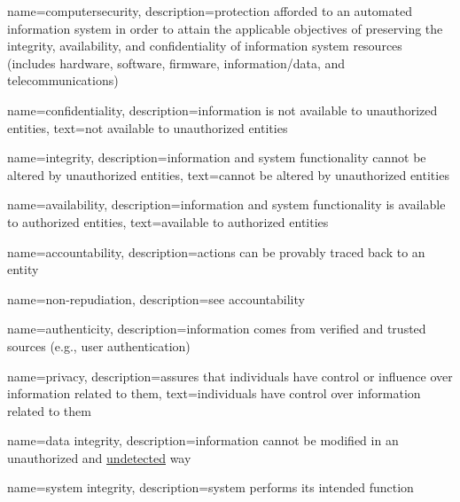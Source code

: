 {\glsentrytext{\glslabel}}%
{\glsentryshortname}%
{\Glsentryshortname}%
{\glsshortname}%
{\Glsshortname}%
{\GLSshortname}%


{
    name=computersecurity,
    description={protection afforded to an automated information system in order to attain the applicable objectives of preserving the \gls{integrity}, \gls{availability}, and \gls{confidentiality} of information system resources (includes hardware, software, firmware, information/data, and telecommunications)}
}

{
    name=confidentiality,
    description={information is not available to unauthorized entities},
    text={not available to unauthorized entities}
}

{
    name=integrity,
    description={information and system functionality cannot be altered by unauthorized entities},
    text={cannot be altered by unauthorized entities}
}

{
    name=availability,
    description={information and system functionality is available to authorized entities},
    text={available to authorized entities}
}

{
    name=accountability,
    description={actions can be provably traced back to an entity}
}

{
    name={non-repudiation},
    description={see \gls{accountability}}
}

{
    name={authenticity},
    description={information comes from verified and trusted sources (e.g., user authentication)}
}

{
    name={privacy},
    description={assures that individuals have control or influence over information related to them},
    text={individuals have control over information related to them}
}

{
    name={data integrity},
    description={information cannot be modified in an unauthorized and \underline{undetected} way}
}


{
    name={system integrity},
    description={system performs its intended function}
}

